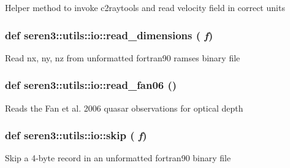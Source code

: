 \label{namespaceseren3_1_1utils_1_1io_a00c3cdbfb36d9c2090f1ab760e1acddb}
\begin{DoxyVerb}
Helper method to invoke c2raytools and read velocity field in correct units
\end{DoxyVerb}
 \hypertarget{namespaceseren3_1_1utils_1_1io_a1e51f115762ffa143326db50f5ddd329}{
\subsubsection[{read\_\-dimensions}]{\setlength{\rightskip}{0pt plus 5cm}def seren3::utils::io::read\_\-dimensions ( {\em f})}}
\label{namespaceseren3_1_1utils_1_1io_a1e51f115762ffa143326db50f5ddd329}
\begin{DoxyVerb}
Read nx, ny, nz from unformatted fortran90 ramses binary file
\end{DoxyVerb}
 \hypertarget{namespaceseren3_1_1utils_1_1io_a70538d01ca9d56833ff828f0dca3c0b7}{
\subsubsection[{read\_\-fan06}]{\setlength{\rightskip}{0pt plus 5cm}def seren3::utils::io::read\_\-fan06 ()}}
\label{namespaceseren3_1_1utils_1_1io_a70538d01ca9d56833ff828f0dca3c0b7}
\begin{DoxyVerb}
Reads the Fan et al. 2006 quasar observations for optical depth
\end{DoxyVerb}
 \hypertarget{namespaceseren3_1_1utils_1_1io_a5adaef91712cb2ec5700083eddfed928}{
\subsubsection[{skip}]{\setlength{\rightskip}{0pt plus 5cm}def seren3::utils::io::skip ( {\em f})}}
\label{namespaceseren3_1_1utils_1_1io_a5adaef91712cb2ec5700083eddfed928}
\begin{DoxyVerb}
Skip a 4-byte record in an unformatted fortran90 binary file
\end{DoxyVerb}
 